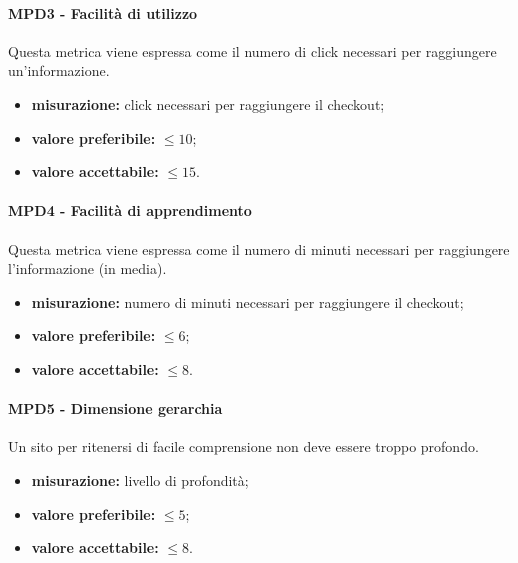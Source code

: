 \paragraph{MPD3 - Facilità di utilizzo} Questa metrica viene espressa come il numero di click necessari per raggiungere un'informazione.
\begin{itemize}
	\item \textbf{misurazione:} click necessari per raggiungere il checkout;
	\item \textbf{valore preferibile:} \begin{math}\leq10\end{math};
	\item \textbf{valore accettabile:} \begin{math}\leq15\end{math}.
\end{itemize}
\paragraph{MPD4 - Facilità di apprendimento} Questa metrica viene espressa come il numero di minuti necessari per raggiungere l'informazione (in media).
\begin{itemize}
	\item \textbf{misurazione:} numero di minuti necessari per raggiungere il checkout;
	\item \textbf{valore preferibile:} \begin{math}\leq6\end{math};
	\item \textbf{valore accettabile:} \begin{math}\leq8\end{math}.
\end{itemize}
\paragraph{MPD5 - Dimensione gerarchia} Un sito per ritenersi di facile comprensione non deve essere troppo profondo.
\begin{itemize}
	\item \textbf{misurazione:} livello di profondità;
	\item \textbf{valore preferibile:} \begin{math}\leq5\end{math};
	\item \textbf{valore accettabile:} \begin{math}\leq8\end{math}.
\end{itemize}
